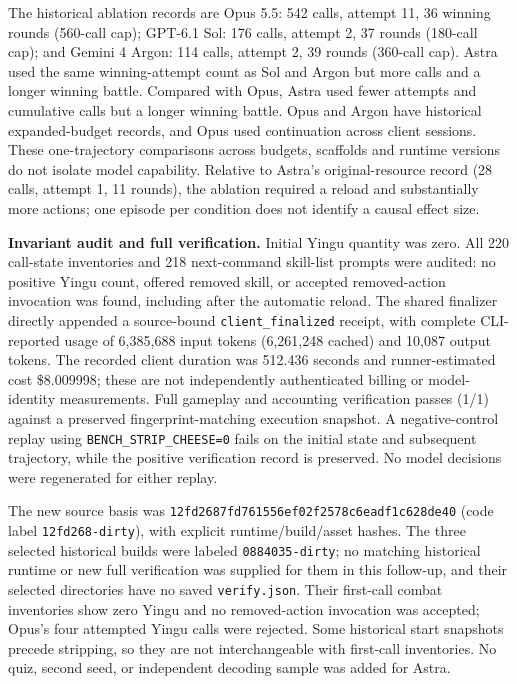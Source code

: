 \documentclass[11pt,a4paper]{article}
\begin{document}
The historical ablation records are Opus 5.5: 542 calls, attempt 11, 36 winning rounds (560-call cap); GPT-6.1 Sol: 176 calls, attempt 2, 37 rounds (180-call cap); and Gemini 4 Argon: 114 calls, attempt 2, 39 rounds (360-call cap). Astra used the same winning-attempt count as Sol and Argon but more calls and a longer winning battle. Compared with Opus, Astra used fewer attempts and cumulative calls but a longer winning battle. Opus and Argon have historical expanded-budget records, and Opus used continuation across client sessions. These one-trajectory comparisons across budgets, scaffolds and runtime versions do not isolate model capability. Relative to Astra's original-resource record (28 calls, attempt 1, 11 rounds), the ablation required a reload and substantially more actions; one episode per condition does not identify a causal effect size.

\textbf{Invariant audit and full verification.} Initial Yingu quantity was zero. All 220 call-state inventories and 218 next-command skill-list prompts were audited: no positive Yingu count, offered removed skill, or accepted removed-action invocation was found, including after the automatic reload. The shared finalizer directly appended a source-bound \texttt{client\allowbreak{}\_\allowbreak{}finalized} receipt, with complete CLI-reported usage of 6,385,688 input tokens (6,261,248 cached) and 10,087 output tokens. The recorded client duration was 512.436 seconds and runner-estimated cost \$8.009998; these are not independently authenticated billing or model-identity measurements. Full gameplay and accounting verification passes (1/1) against a preserved fingerprint-matching execution snapshot. A negative-control replay using \texttt{BENCH\allowbreak{}\_\allowbreak{}STRIP\allowbreak{}\_\allowbreak{}CHEESE\allowbreak{}=\allowbreak{}0} fails on the initial state and subsequent trajectory, while the positive verification record is preserved. No model decisions were regenerated for either replay.

The new source basis was \texttt{12fd2687\allowbreak{}fd761556\allowbreak{}ef02f257\allowbreak{}8c6eadf1\allowbreak{}c628de40} (code label \texttt{12fd268\allowbreak{}-\allowbreak{}dirty}), with explicit runtime/build/asset hashes. The three selected historical builds were labeled \texttt{0884035\allowbreak{}-\allowbreak{}dirty}; no matching historical runtime or new full verification was supplied for them in this follow-up, and their selected directories have no saved \texttt{verify\allowbreak{}.\allowbreak{}json}. Their first-call combat inventories show zero Yingu and no removed-action invocation was accepted; Opus's four attempted Yingu calls were rejected. Some historical start snapshots precede stripping, so they are not interchangeable with first-call inventories. No quiz, second seed, or independent decoding sample was added for Astra.
\end{document}
